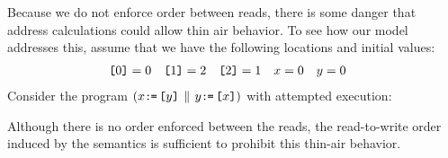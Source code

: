 

Because we do not
enforce order between reads, there is some danger that address calculations
could allow thin air behavior.   To see how our model addresses this, assume
that we have the following locations and initial values:
\begin{align*}
  \texttt{[}0\texttt{]}&=0  &
  \texttt{[}1\texttt{]}&=2  &
  \texttt{[}2\texttt{]}&=1  &
  x &=0 &
  y &=0 
\end{align*}
Consider the program
\begin{math}
  (x\texttt{:}\mkern-1mu\texttt{=}\,\texttt{[}y\texttt{]} \,\mathbin{\|}\, y\texttt{:}\mkern-1mu\texttt{=}\,\texttt{[}x\texttt{]})
\end{math}
with attempted execution:
\begin{tikzdisplay}[node distance=1em]
\end{tikzdisplay}
Although there is no order enforced between the reads, the read-to-write
order induced by the semantics is sufficient to prohibit this thin-air
behavior.

